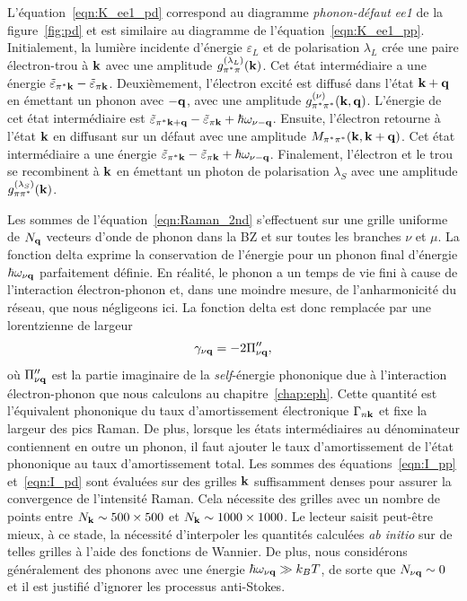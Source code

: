 L'équation~\eqref{eqn:K_ee1_pd} correspond au diagramme \textit{phonon-défaut} \textit{ee1} de la figure~\ref{fig:pd} et est similaire au diagramme de l'équation~\eqref{eqn:K_ee1_pp}. Initialement, la lumière incidente d'énergie $\varepsilon_L$ et de polarisation $\lambda_L$ crée une paire électron-trou à $\mathbf{k}$ avec une amplitude $g_{\pi^*\pi}^{(\lambda_L)}(\mathbf{k})$. Cet état intermédiaire a une énergie $\tilde{\varepsilon}_{\pi^*\mathbf{k}}-\tilde{\varepsilon}_{\pi\mathbf{k}}$. Deuxièmement, l'électron excité est diffusé dans l'état $\mathbf{k}+\mathbf{q}$ en émettant un phonon avec $-\mathbf{q}$, avec une amplitude $g_{\pi^*\pi^*}^{(\nu)}(\mathbf{k},\mathbf{q})$. L'énergie de cet état intermédiaire est $\tilde{\varepsilon}_{\pi^*\mathbf{k}+\mathbf{q}}-\tilde{\varepsilon}_{\pi\mathbf{k}}+\hbar\omega_{\nu-\mathbf{q}}$. Ensuite, l'électron retourne à l'état $\mathbf{k}$ en diffusant sur un défaut avec une amplitude $M_{\pi^*\pi^*}(\mathbf{k},\mathbf{k}+\mathbf{q})$. Cet état intermédiaire a une énergie $\tilde{\varepsilon}_{\pi^*\mathbf{k}}-\tilde{\varepsilon}_{\pi\mathbf{k}}+\hbar\omega_{\nu-\mathbf{q}}$. Finalement, l'électron et le trou se recombinent à $\mathbf{k}$ en émettant un photon de polarisation $\lambda_S$ avec une amplitude $g_{\pi\pi^*}^{(\lambda_S)}(\mathbf{k})$.

Les sommes de l'équation~\eqref{eqn:Raman_2nd} s'effectuent sur une grille uniforme de $N_{\mathbf{q}}$ vecteurs d'onde de phonon dans la BZ et sur toutes les branches $\nu$ et $\mu$. La fonction delta exprime la conservation de l'énergie pour un phonon final d'énergie $\hbar\omega_{\nu\mathbf{q}}$ parfaitement définie. En réalité, le phonon a un temps de vie fini à cause de l'interaction électron-phonon et, dans une moindre mesure, de l'anharmonicité du réseau, que nous négligeons ici. La fonction delta est donc remplacée par une lorentzienne de largeur
\begin{equation}
    \gamma_{\nu\mathbf{q}} = -2\Pi''_{\nu\mathbf{q}},
\end{equation}
où $\Pi''_{\nu\mathbf{q}}$ est la partie imaginaire de la \textit{self}-énergie phononique due à l'interaction électron-phonon que nous calculons au chapitre~\ref{chap:eph}. Cette quantité est l'équivalent phononique du taux d'amortissement électronique $\Gamma_{n\mathbf{k}}$ et fixe la largeur des pics Raman. De plus, lorsque les états intermédiaires au dénominateur contiennent en outre un phonon, il faut ajouter le taux d'amortissement de l'état phononique au taux d'amortissement total. Les sommes des équations~\eqref{eqn:I_pp} et~\eqref{eqn:I_pd} sont évaluées sur des grilles $\mathbf{k}$ suffisamment denses pour assurer la convergence de l'intensité Raman. Cela nécessite des grilles avec un nombre de points entre $N_{\mathbf{k}}\sim 500\times 500$ et $N_{\mathbf{k}}\sim 1000\times 1000$. Le lecteur saisit peut-être mieux, à ce stade, la nécessité d'interpoler les quantités calculées \textit{ab initio} sur de telles grilles à l'aide des fonctions de Wannier. De plus, nous considérons généralement des phonons avec une énergie $\hbar\omega_{\nu\mathbf{q}}\gg k_BT$, de sorte que $N_{\nu\mathbf{q}}\sim 0$ et il est justifié d'ignorer les processus anti-Stokes.

